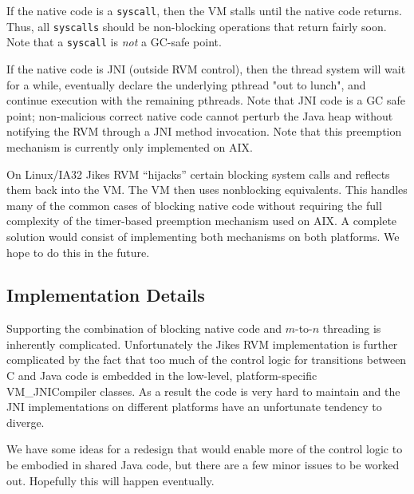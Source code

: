 If the native code is a {\tt syscall}, then the VM stalls until the native
code returns.  Thus, all {\tt syscalls} should be non-blocking
operations that return fairly soon.  Note that a {\tt syscall} is 
{\em not} a GC-safe point.

If the native code is JNI (outside RVM control), then the thread system
will wait for a while, eventually declare the underlying pthread "out to
lunch", and continue execution with the remaining pthreads.  Note that 
JNI code is a GC safe point; non-malicious correct native code cannot
perturb the Java heap without notifying the RVM through a JNI method
invocation.  Note that this preemption mechanism is currently only
implemented on AIX.

On Linux/IA32 Jikes RVM ``hijacks'' certain blocking system calls and
reflects them back into the VM. The VM then uses nonblocking
equivalents. This handles many of the common cases of blocking native
code without requiring the full complexity of the timer-based
preemption mechanism used on AIX. A complete solution would consist of
implementing both mechanisms on both platforms.  We hope to do this in
the future.

\subsection{Implementation Details}
Supporting the combination of blocking native code and $m$-to-$n$
threading is inherently complicated.  Unfortunately the Jikes RVM
implementation is further complicated by the fact that too much of the
control logic for transitions between C and Java code is embedded in
the low-level, platform-specific {VM\_JNICompiler} classes. As a
result the code is very hard to maintain and the JNI implementations
on different platforms have an unfortunate tendency to diverge. 

We have some ideas for a redesign that would enable more of the
control logic to be embodied in shared Java code, but there are a few
minor issues to be worked out. Hopefully this will happen eventually.
